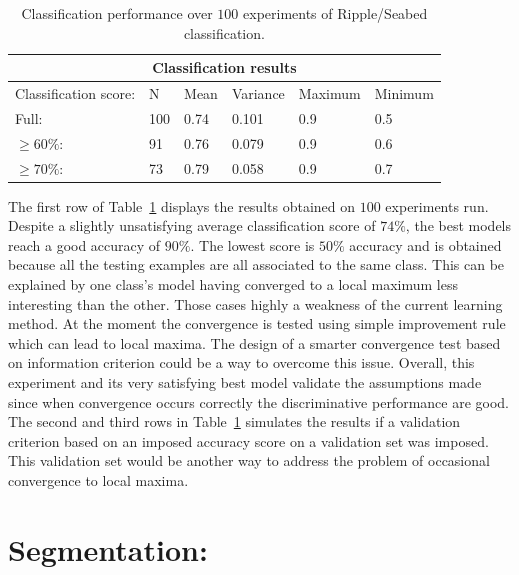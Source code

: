 \documentclass[a4paper,11pt]{report}
\begin{document}
		\begin{center}
			\begin{table}[h]
				\begin{center}				
					\begin{tabular}{ |p{3cm}||p{2cm}|p{2cm}|p{2cm}|p{2cm}|p{2cm}| }
						\hline
						\multicolumn{6}{|c|}{Classification results} \\
						\hline
						Classification score:	&	N			& Mean	& Variance	& Maximum	& Minimum \\
						\hline
						Full:									& 100   & 0.74	& 0.101			& 0.9				&	0.5\\
						$\geq 60\%$: 					& 91    & 0.76	& 0.079			& 0.9				&	0.6\\
						$\geq 70\%$: 					& 73    & 0.79	& 0.058			& 0.9				&	0.7\\
						\hline
					\end{tabular}
				\end{center}
				\caption{Classification performance over $100$ experiments of Ripple/Seabed classification.}
				\label{table:Clf_ripple}
			\end{table}
		\end{center}
		
		The first row of Table~\ref{table:Clf_ripple} displays the results obtained on $100$ experiments run. Despite a slightly unsatisfying average  classification score of $74\%$, the best models reach a good accuracy of $90\%$. The lowest score is $50\%$ accuracy and is obtained because all the testing examples are all associated to the same class. This can be explained by one class's model having converged to a local maximum less interesting than the other. Those cases highly a weakness of the current learning method. At the moment the convergence is tested using simple improvement rule which can lead to local maxima. The design of a smarter convergence test based on information criterion could be a way to overcome this issue. Overall, this experiment and its very satisfying best model validate the assumptions made since when convergence occurs correctly the discriminative performance are good. The second and third rows in Table~\ref{table:Clf_ripple} simulates the results if a validation criterion based on an imposed accuracy score on a validation set was imposed. This validation set would be another way to address the problem of occasional convergence to local maxima. 
		
  \section{Segmentation:}
		\label{sec:Exp/Segmentation:}
		
\end{document}
